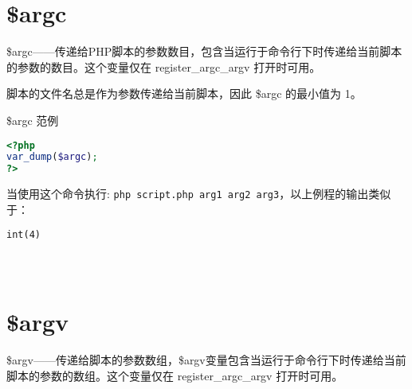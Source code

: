 \section{\$argc}


\$argc——传递给PHP脚本的参数数目，包含当运行于命令行下时传递给当前脚本的参数的数目。这个变量仅在 register\_argc\_argv 打开时可用。

脚本的文件名总是作为参数传递给当前脚本，因此 \$argc 的最小值为 1。



\begin{example}
\$argc 范例
\begin{lstlisting}[language=PHP]
<?php
var_dump($argc);
?>
\end{lstlisting}
\end{example}

当使用这个命令执行: \verb|php script.php arg1 arg2 arg3|，以上例程的输出类似于：

\begin{verbatim}
int(4)
\end{verbatim}



\begin{example}

\begin{lstlisting}[language=PHP]

\end{lstlisting}
\end{example}

\begin{example}

\begin{lstlisting}[language=PHP]

\end{lstlisting}
\end{example}

\begin{example}

\begin{lstlisting}[language=PHP]

\end{lstlisting}
\end{example}



\section{\$argv}

\$argv——传递给脚本的参数数组，\$argv变量包含当运行于命令行下时传递给当前脚本的参数的数组。这个变量仅在 register\_argc\_argv 打开时可用。

